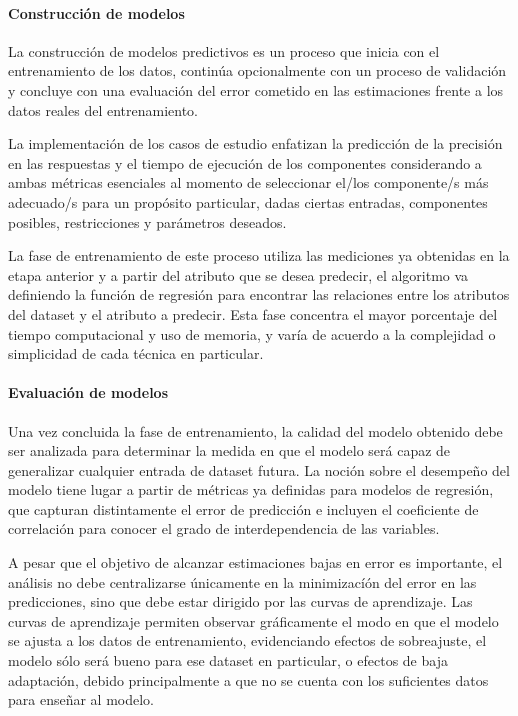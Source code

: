 \paragraph{Construcción de modelos }

La construcción de modelos predictivos es un proceso que inicia con
el entrenamiento de los datos, continúa opcionalmente con un proceso
de validación y concluye con una evaluación del error cometido en
las estimaciones frente a los datos reales del entrenamiento.

La implementación de los casos de estudio enfatizan la predicción
de la precisión en las respuestas y el tiempo de ejecución de los
componentes considerando a ambas métricas esenciales al momento de
seleccionar el/los componente/s más adecuado/s para un propósito particular,
dadas ciertas entradas, componentes posibles, restricciones y parámetros
deseados.

La fase de entrenamiento de este proceso utiliza las mediciones ya
obtenidas en la etapa anterior y a partir del atributo que se desea
predecir, el algoritmo va definiendo la función de regresión para
encontrar las relaciones entre los atributos del dataset y el atributo
a predecir. Esta fase concentra el mayor porcentaje del tiempo computacional
y uso de memoria, y varía de acuerdo a la complejidad o simplicidad
de cada técnica en particular. 


\paragraph{Evaluación de modelos}

Una vez concluida la fase de entrenamiento, la calidad del modelo
obtenido debe ser analizada para determinar la medida en que el modelo
será capaz de generalizar cualquier entrada de dataset futura. La
noción sobre el desempeño del modelo tiene lugar a partir de métricas
ya definidas para modelos de regresión, que capturan distintamente
el error de predicción e incluyen el coeficiente de correlación para
conocer el grado de interdependencia de las variables. 

A pesar que el objetivo de alcanzar estimaciones bajas en error es
importante, el análisis no debe centralizarse únicamente en la minimizacíón
del error en las predicciones, sino que debe estar dirigido por las
curvas de aprendizaje. Las curvas de aprendizaje permiten observar
gráficamente el modo en que el modelo se ajusta a los datos de entrenamiento,
evidenciando efectos de sobreajuste, el modelo sólo será bueno para
ese dataset en particular, o efectos de baja adaptación, debido principalmente
a que no se cuenta con los suficientes datos para enseñar al modelo. 


